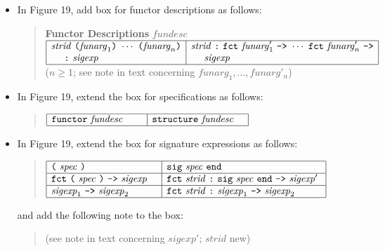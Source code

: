 \documentclass[twoside,titlepage]{article}
\begin{document}
\begin{appendix}
\begin{itemize}
\item In Figure 19, add box for functor descriptions as follows:
  \begin{quote}
  {\bf Functor Descriptions} $\mathit{fundesc}$ \\
  $\begin{array}{|l|l|}
  \hline
  \mathit{strid}~\mbox{\tt(}\mathit{funarg}_1\mbox{\tt)}~\cdots~\mbox{\tt(}\mathit{funarg}_n\mbox{\tt)}
  & \mathit{strid}~\mbox{\tt:}~{\tt{fct}}~\mathit{funarg}'_1~\mbox{\tt->}~\cdots~{\tt{fct}}~\mathit{funarg}'_n~\mbox{\tt->} \\
  ~~~~\mbox{\tt:}~\mathit{sigexp}
  & ~~~~\mathit{sigexp} \\
  \hline
  \end{array}$ \\
  ($n\geq1$; see note in text concerning $\mathit{funarg}_1,\dots,\mathit{funarg}'_n$) 
  \end{quote}

\item In Figure 19, extend the box for specifications as follows:
  \begin{quote}
  $\begin{array}{|l|l|}
  \hline
  {\tt{functor}}~\mathit{fundesc}~~~~~~
  & {\tt{structure}}~\mathit{fundesc}~~~ \\
  \hline
  \end{array}$ \\
  \end{quote}

\item In Figure 19, extend the box for signature expressions as follows:
  \begin{quote}
  $\begin{array}{|l|l|}
  \hline
  \mbox{\tt(}~\mathit{spec}~\mbox{\tt)}~~~~
  & {\tt{sig}}~\mathit{spec}~{\tt{end}}~~ \\
  \hline
  {\tt{fct}}~\mbox{\tt(}~\mathit{spec}~\mbox{\tt)}~\mbox{\tt->}~\mathit{sigexp}~~~
  & {\tt{fct}}~\mathit{strid}~\mbox{\tt:}~{\tt{sig}}~\mathit{spec}~{\tt{end}}~\mbox{\tt->}~\mathit{sigexp}'~ \\
  \hline
  \mathit{sigexp}_1~\mbox{\tt->}~\mathit{sigexp}_2~~~
  & {\tt{fct}}~\mathit{strid}~\mbox{\tt:}~\mathit{sigexp}_1~\mbox{\tt->}~\mathit{sigexp}_2~ \\
  \hline
  \end{array}$
  \end{quote}
  and add the following note to the box:
  \begin{quote}
  (see note in text concerning $\mathit{sigexp}'$; $\mathit{strid}$ new) 
  \end{quote}


\end{itemize}
\end{appendix}
\end{document}
